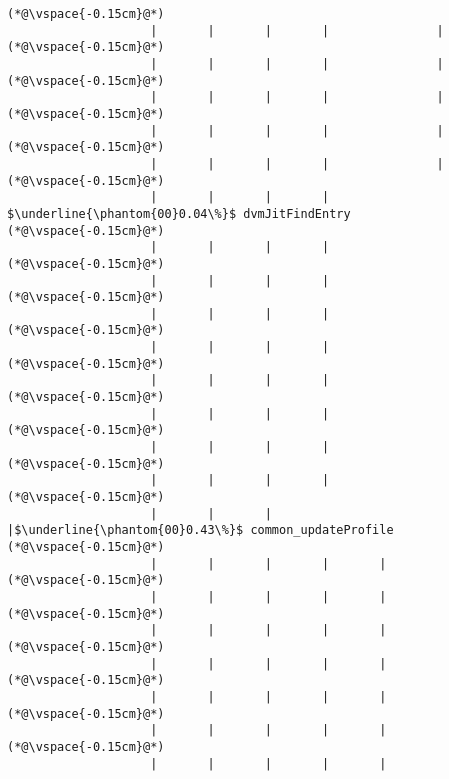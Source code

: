 \begin{lstlisting}[caption=Staattinen metodi C$\to$Java , label=profile:C2JBenchmark00001, numberbychapter=true, frame=lines, float, floatplacement=t]
(*@\vspace{-0.15cm}@*)
                    |       |       |       |               |
(*@\vspace{-0.15cm}@*)
                    |       |       |       |               |
(*@\vspace{-0.15cm}@*)
                    |       |       |       |               |
(*@\vspace{-0.15cm}@*)
                    |       |       |       |               |
(*@\vspace{-0.15cm}@*)
                    |       |       |       |               |
(*@\vspace{-0.15cm}@*)
                    |       |       |       |                $\underline{\phantom{00}0.04\%}$ dvmJitFindEntry
(*@\vspace{-0.15cm}@*)
                    |       |       |       |
(*@\vspace{-0.15cm}@*)
                    |       |       |       |
(*@\vspace{-0.15cm}@*)
                    |       |       |       |
(*@\vspace{-0.15cm}@*)
                    |       |       |       |
(*@\vspace{-0.15cm}@*)
                    |       |       |       |
(*@\vspace{-0.15cm}@*)
                    |       |       |       |
(*@\vspace{-0.15cm}@*)
                    |       |       |       |
(*@\vspace{-0.15cm}@*)
                    |       |       |       |
(*@\vspace{-0.15cm}@*)
                    |       |       |       |$\underline{\phantom{00}0.43\%}$ common_updateProfile
(*@\vspace{-0.15cm}@*)
                    |       |       |       |       |
(*@\vspace{-0.15cm}@*)
                    |       |       |       |       |
(*@\vspace{-0.15cm}@*)
                    |       |       |       |       |
(*@\vspace{-0.15cm}@*)
                    |       |       |       |       |
(*@\vspace{-0.15cm}@*)
                    |       |       |       |       |
(*@\vspace{-0.15cm}@*)
                    |       |       |       |       |
(*@\vspace{-0.15cm}@*)
                    |       |       |       |       |

\end{lstlisting}
